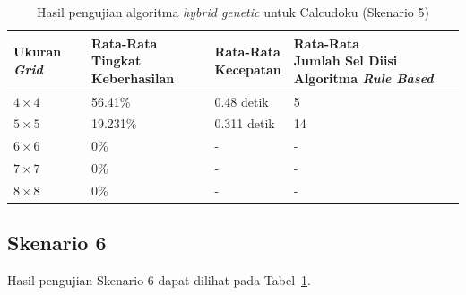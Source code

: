 \begin{table}
\centering
\captionsetup{justification=centering}
\caption[Hasil pengujian algoritma \textit{hybrid genetic} untuk Calcudoku (Skenario 5)]{Hasil pengujian algoritma \textit{hybrid genetic} untuk Calcudoku (Skenario 5)}
\begin{tabular}{| l | l | l | l |}
\hline
Ukuran \textit{Grid} & \makecell[c]{Rata-Rata \\ Tingkat Keberhasilan} & \makecell[c]{Rata-Rata \\ Kecepatan} & \makecell[c]{Rata-Rata \\ Jumlah Sel Diisi Algoritma \textit{Rule Based}} \\
\hline \hline
\begin{math}4 \times 4\end{math} & 56.41\% & 0.48 detik & 5 \\
\hline
\begin{math}5 \times 5\end{math} & 19.231\% & 0.311 detik & 14 \\
\hline
\begin{math}6 \times 6\end{math} & 0\% & - & - \\
\hline
\begin{math}7 \times 7\end{math} & 0\% & - & - \\
\hline
\begin{math}8 \times 8\end{math} & 0\% & - & - \\
\hline
\end{tabular}
\label{tab:pengujianhg5}
\end{table}

\subsection{Skenario 6}
\label{sec:skenario6}

Hasil pengujian Skenario 6 dapat dilihat pada Tabel~\ref{tab:pengujianhg5}.

